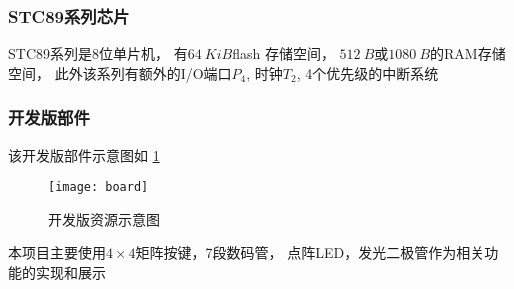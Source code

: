 \documentclass[../main.tex]{subfiles} %
\begin{document}
\subsubsection{STC89系列芯片}

  STC89系列是8位单片机，
  有$\SI{64}{KiB}$flash 存储空间，
  $\SI{512}{B}$或$\SI{1080}{B}$的RAM存储空间，
  此外该系列有额外的I/O端口$P_4$,
  时钟$T_2$,
  4个优先级的中断系统

\subsubsection{开发版部件}
  该开发版部件示意图如%
  \cref{fig:board}

  \begin{figure}[H]
    \centering
    \texttt{[image: board]}
    \caption{开发版资源示意图}
    \label{fig:board}
  \end{figure}
  本项目主要使用$4 \times 4$矩阵按键，7段数码管，
  点阵LED，发光二极管作为相关功能的实现和展示
\end{document}
